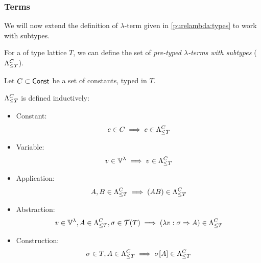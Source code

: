 \documentclass[main.tex]{subfiles}
\begin{document}
\subsubsection{Terms}
We will now extend the definition of $\lambda$-term given in \cref{purelambda:types}
to work with subtypes.

For a of type lattice $T$, we can define the set of
\emph{pre-typed $\lambda$-terms with subtypes} ($\fancylambda{T}{C}$).

\begin{defn}
    Let $C \subset \const$ be a set of constants, typed in $T$.

    $\fancylambda{T}{C}$ is defined inductively:
    \begin{itemize}
        \item Constant:    \[ c \in C \implies c \in \fancylambda{T}{C} \]
        \item Variable:    \[ v \in \lvars \implies v \in \fancylambda{T}{C} \]
        \item Application: \[ A, B \in \fancylambda{T}{C} \implies (AB) \in \fancylambda{T}{C} \]
        \item Abstraction: \[ v \in \lvars, A \in \fancylambda{T}{C}, \sigma \in \tclos{T}
                \implies (\lambda v : \sigma \abstr A) \in \fancylambda{T}{C} \]
        \item Construction: \[ \sigma \in T, A \in \fancylambda{T}{C}
                \implies \sigma[A] \in \fancylambda{T}{C} \]
    \end{itemize}
\end{defn}
\end{document}
